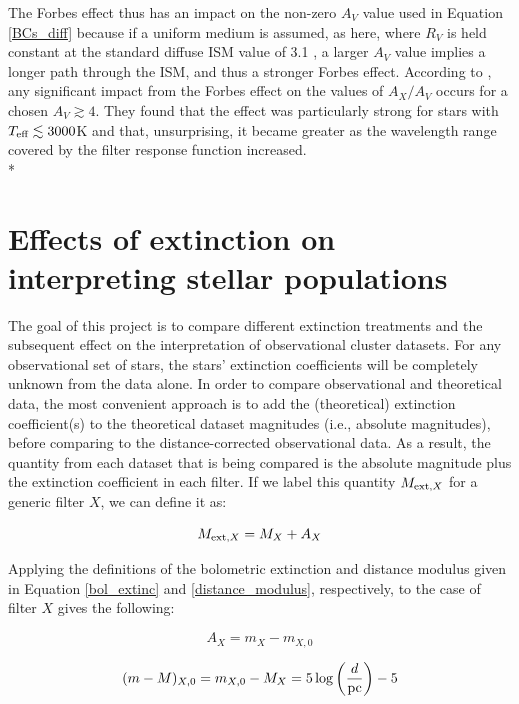 \documentclass[12pt, a4paper]{report}
\begin{document}
The Forbes effect thus has an impact on the non-zero $A_{V}$ value used in Equation \ref{BCs_diff} because if a uniform medium is assumed, as here, where $R_{V}$ is held constant at the standard diffuse ISM value of 3.1 \citep{1989ApJ...345..245C}, a larger $A_{V}$ value implies a longer path through the ISM, and thus a stronger Forbes effect. According to \cite{2008PASP..120..583G}, any significant impact from the Forbes effect on the values of $A_{X}/A_{V}$ occurs for a chosen $A_{V} \gtrsim 4$. They found that the effect was particularly strong for stars with $T_{\textnormal{eff}} \lesssim 3000$K and that, unsurprising, it became greater as the wavelength range covered by the filter response function increased.\\*

\section{Effects of extinction on interpreting stellar populations} \label{extinc_desc}

The goal of this project is to compare different extinction treatments and the subsequent effect on the interpretation of observational cluster datasets. For any observational set of stars, the stars' extinction coefficients will be completely unknown from the data alone. In order to compare observational and theoretical data, the most convenient approach is to add the (theoretical) extinction coefficient(s) to the theoretical dataset magnitudes (i.e., absolute magnitudes), before comparing to the distance-corrected observational data. As a result, the quantity from each dataset that is being compared is the absolute magnitude plus the extinction coefficient in each filter. If we label this quantity $M_{\textnormal{ext},X}$ for a generic filter $X$, we can define it as:

\begin{equation}
M_{\textnormal{ext},X} = M_{X} + A_{X}
\label{MextX_def}
\end{equation}

Applying the definitions of the bolometric extinction and distance modulus given in Equation \ref{bol_extinc} and \ref{distance_modulus}, respectively, to the case of filter $X$ gives the following:

\begin{equation}
A_{X} = m_{X} - m_{X,0}
\label{extinc_X}
\end{equation}

\begin{equation}
(m - M)_{X,0} = m_{X,0} - M_{X} = 5\log\left(\frac{d}{\textnormal{pc}}\right) - 5
\label{DM_X}
\end{equation}
\end{document}
